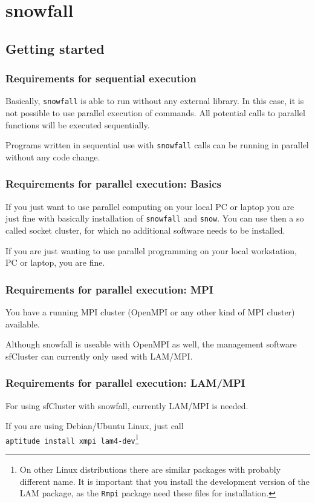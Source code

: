 \documentclass[10pt,oneside]{article}
\begin{document}
\tableofcontents
\newpage
\section{snowfall}
\subsection{Getting started}
\subsubsection{Requirements for sequential execution}
Basically, \texttt{snowfall} is able to run without any external
library. In this case, it is not possible to use parallel execution
of commands. All potential calls to parallel functions will be
executed sequentially.

Programs written in sequential use with \texttt{snowfall} calls
can be running in parallel without any code change.

\subsubsection{Requirements for parallel execution: Basics}
If you just want to use parallel computing on your local PC or
laptop you are just fine with basically installation of
\texttt{snowfall} and \texttt{snow}.
You can use then a so called socket cluster,
for which no additional software needs to be installed.

If you are just wanting to use parallel programming on your
local workstation, PC or laptop, you are fine.

\subsubsection{Requirements for parallel execution: MPI}
You have a running MPI cluster (OpenMPI or any other kind of
MPI cluster) available.

Although snowfall is useable with OpenMPI as well, the
management software sfCluster can currently only used with
LAM/MPI.

\subsubsection{Requirements for parallel execution: LAM/MPI}
For using sfCluster with snowfall, currently LAM/MPI is needed.

If you are using Debian/Ubuntu Linux, just call\\
\texttt{aptitude install xmpi lam4-dev}\footnote{On other Linux distributions
there are similar packages with probably different name. It is important
that you install the development version of the LAM package, as the
\texttt{Rmpi} package need these files for installation.}
\end{document}
